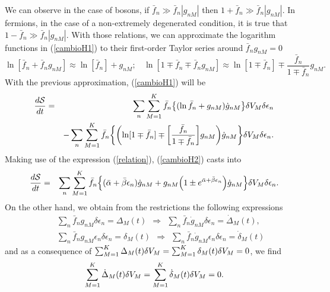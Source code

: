 We can observe in the case of bosons, if $\bar{f}_n \gg \bar{f}_n |g_{nM}|$
then $1+\bar{f}_n \gg \bar{f}_n |g_{nM}|$. In fermions, in the case of a
non-extremely degenerated condition, it is true that $1-\bar{f}_n \gg \bar{f}_n
|g_{nM}|$. With those relations, we can approximate the logarithm functions in
(\ref{cambioH1}) to their first-order Taylor series around $\bar f_n g_{nM}=0$
%
\begin{equation}
    \ln [\bar{f}_n+\bar{f}_n g_{nM}] \approx \ln [\bar{f}_n]+ g_{nM}; \ \ \ \ \ln[1\mp\bar{f}_n\mp\bar{f}_n g_{nM}] \approx \ln[1\mp\bar{f}_n]\mp\frac{\bar{f}_n}{1\mp\bar{f}_{n}} g_{nM}. \label{lnapproximation}
\end{equation}
%
With the previous approximation, (\ref{cambioH1}) will be
%
\begin{eqnarray}
    \frac{d\Ss}{dt}&=&\sum_n \sum_{M=1}^{K} \bar{f}_n\left \{ (\ln \bar{f}_n+ g_{nM})\dot{g}_{nM}\right\} \de V_M \delta \epsilon_n \nonumber \\
    &&-\sum_{n}\sum_{M=1}^{K}\bar f_n\left\{ \left( \ln[1\mp\bar{f}_n]\mp \left[\frac{\bar{f}_n}{1\mp\bar{f}_n} \right] g_{nM}\right)\dot{g}_{nM} \right \}\de V_M \delta \epsilon_n.\label{cambioH2}
\end{eqnarray}
%
Making use of the expression (\ref{relation}),
(\ref{cambioH2}) casts into
%
\begin{eqnarray}
    \frac{d\Ss}{dt}&=&\sum_n \sum_{M=1}^{K} \bar{f}_n\left \{ (\bar{\alpha}+\bar{\beta}{\epsilon}_n)\dot{g}_{nM}+ g_{nM}\left(1\pm e^{\bar{\alpha}+\bar{\beta}{\epsilon}_n}\right)\dot{g}_{nM} \right \} \de V_M \delta \epsilon_n. \nonumber \\
    \label{cambioH3}
\end{eqnarray}
%
On the other hand, we obtain from the restrictions the following expressions
%
\begin{eqnarray}
    &&\sum_n \bar{f}_n g_{nM} \delta \epsilon_n=\Delta_M(t) \ \  \Rightarrow \ \  \sum_n \bar{f}_n \dot{g}_{nM} \delta \epsilon_n=\dot{\Delta}_M(t), \nonumber \\
    &&\sum_n  \bar{f}_n g_{nM}\epsilon_n \delta \epsilon_n=\delta_M(t) \ \  \Rightarrow \ \  \sum_n \bar{f}_n \dot{g}_{nM}\epsilon_n \delta \epsilon_n=\dot{\delta}_M(t)
\end{eqnarray}
%
and as a consequence of $\sum_{M=1}^{K} \Delta_M(t) \delta V_M  =\sum_{M=1}^{K} \delta_M(t) \delta V_M =0$, we find
%
\begin{equation}
    \sum_{M=1}^{K} \dot{\Delta}_M(t) \delta V_M =\sum_{M=1}^{K} \dot{\delta}_{M}(t) \delta V_M=0.
\end{equation}
